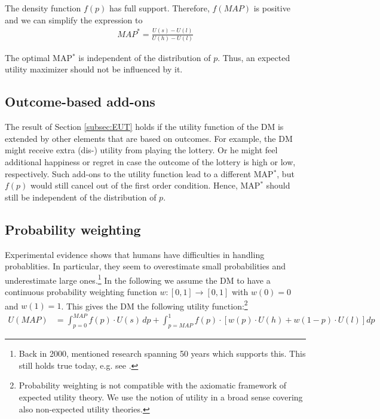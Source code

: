 The density function $f(p)$ has full support.
Therefore, $f(\textit{MAP})$ is positive and we can simplify the expression to 
\begin{align}
	\textit{MAP}^* = \frac{U(s)-U(l)}{U(h)-U(l)}
\end{align}

The optimal MAP$^*$ is independent of the distribution of $p$.
Thus, an expected utility maximizer should not be influenced by it. 


\subsection{Outcome-based add-ons}

The result of Section \ref{subsec:EUT} holds if the utility function of the DM is extended by other elements that are based on outcomes.
For example, the DM might receive extra \mbox{(dis-)} utility from playing the lottery.
Or he might feel additional happiness or regret in case the outcome of the lottery is high or low, respectively.
Such add-ons to the utility function lead to a different MAP$^*$, but $f(p)$ would still cancel out of the first order condition.
Hence, MAP$^*$ should still be independent of the distribution of $p$.  


\subsection{Probability weighting}

Experimental evidence shows that humans have difficulties in handling probablities.
In particular, they seem to overestimate small probabilities and underestimate large ones.\footnote{
Back in 2000, \citet[p.~348--349]{Starmer2000} mentioned research spanning 50 years which supports this.
This still holds true today, e.g. see \citet[Figure 4 on p.~276]{Li2020a}.  
} 
In the following we assume the DM to have a continuous probability weighting function $w: [0,1] \rightarrow [0,1]$ with $w(0) = 0$ and $w(1) = 1$.
This gives the DM the following utility function:\footnote{
Probability weighting is not compatible with the axiomatic framework of expected utility theory.
We use the notion of utility in a broad sense covering also non-expected utility theories.
}
\begin{align}
	U(\textit{MAP}) &= \int_{p=0}^{\textit{MAP}} f(p) \cdot U(s) \, dp %
	+ \int_{p=\textit{MAP}}^1 f(p) \cdot \left[w(p) \cdot U(h) + w(1-p) \cdot U(l) \right] dp
\end{align}

